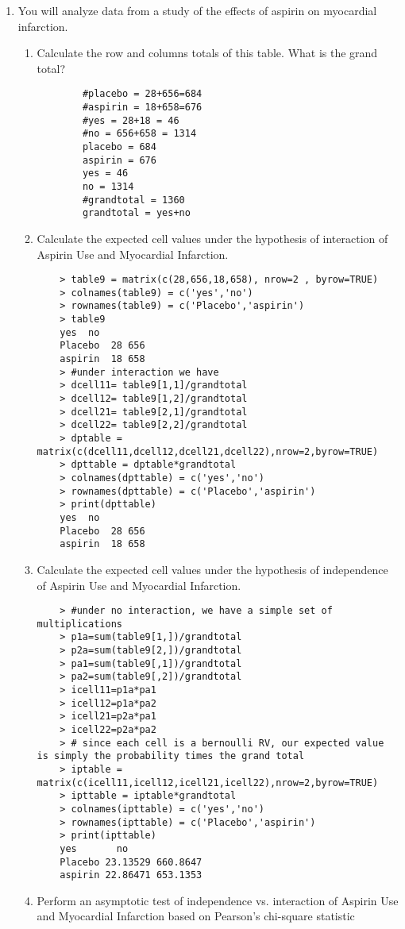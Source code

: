 \documentclass[11pt]{article}
\begin{document}
\begin{enumerate}
\begin{enumerate}
\begin{verbatim}
	\end{verbatim}
\end{enumerate}
\item You will analyze data from a study of the effects of aspirin on myocardial infarction.
\begin{enumerate}
	\item Calculate the row and columns totals of this table. What is the grand total?
	\begin{verbatim}
		#placebo = 28+656=684
		#aspirin = 18+658=676
		#yes = 28+18 = 46
		#no = 656+658 = 1314
		placebo = 684
		aspirin = 676
		yes = 46
		no = 1314
		#grandtotal = 1360
		grandtotal = yes+no 
	\end{verbatim}
	\item Calculate the expected cell values under the hypothesis of interaction of Aspirin Use and Myocardial Infarction.
	\begin{verbatim}
	> table9 = matrix(c(28,656,18,658), nrow=2 , byrow=TRUE)
	> colnames(table9) = c('yes','no')
	> rownames(table9) = c('Placebo','aspirin')
	> table9
	yes  no
	Placebo  28 656
	aspirin  18 658
	> #under interaction we have
	> dcell11= table9[1,1]/grandtotal
	> dcell12= table9[1,2]/grandtotal
	> dcell21= table9[2,1]/grandtotal
	> dcell22= table9[2,2]/grandtotal
	> dptable = matrix(c(dcell11,dcell12,dcell21,dcell22),nrow=2,byrow=TRUE)
	> dpttable = dptable*grandtotal
	> colnames(dpttable) = c('yes','no')
	> rownames(dpttable) = c('Placebo','aspirin')
	> print(dpttable)
	yes  no
	Placebo  28 656
	aspirin  18 658
	\end{verbatim}
	\item Calculate the expected cell values under the hypothesis of independence of Aspirin Use and Myocardial Infarction.
	\begin{verbatim}
	> #under no interaction, we have a simple set of multiplications
	> p1a=sum(table9[1,])/grandtotal
	> p2a=sum(table9[2,])/grandtotal
	> pa1=sum(table9[,1])/grandtotal
	> pa2=sum(table9[,2])/grandtotal
	> icell11=p1a*pa1
	> icell12=p1a*pa2
	> icell21=p2a*pa1
	> icell22=p2a*pa2
	> # since each cell is a bernoulli RV, our expected value is simply the probability times the grand total
	> iptable = matrix(c(icell11,icell12,icell21,icell22),nrow=2,byrow=TRUE)
	> ipttable = iptable*grandtotal
	> colnames(ipttable) = c('yes','no')
	> rownames(ipttable) = c('Placebo','aspirin')
	> print(ipttable)
	yes       no
	Placebo 23.13529 660.8647
	aspirin 22.86471 653.1353
	\end{verbatim}
	\item Perform an asymptotic test of independence vs. interaction of Aspirin Use and Myocardial Infarction based on Pearson’s chi-square statistic

\end{enumerate}
\end{enumerate}
\end{document}
